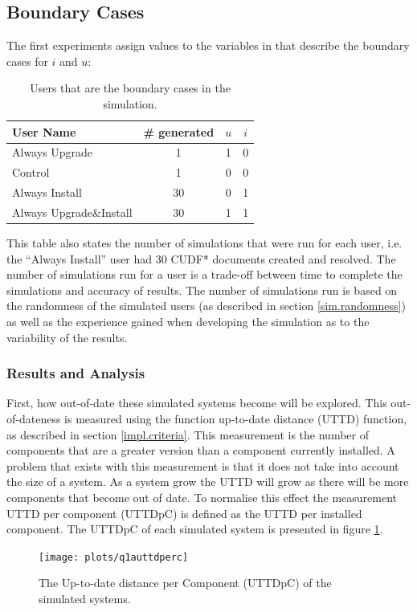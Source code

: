 \subsection{Boundary Cases}
The first experiments assign values to the variables in \usermodel that describe the boundary cases for $i$ and $u$:
\begin{table}[h!]
\centering
\begin{tabular}{|l | c | c | c |}
\hline
User Name 				 	& \# generated 	& $u$ 		& $i$ 			\\ \hline
Always Upgrade				& 1 			&1			& 0				 \\
Control						& 1 			& 0			& 0				\\
Always Install 				& 30 			& 0			& 1				 \\
Always Upgrade\&Install 	& 30 			&1			& 1				\\ \hline
\end{tabular}
\caption{Users that are the boundary cases in the simulation.}
\label{exp.tblextremeusers}
\end{table}
This table also states the number of simulations that were run for each user, i.e. the ``Always Install'' user had 30 CUDF* documents created and resolved.
The number of simulations run for a user is a trade-off between time to complete the simulations and accuracy of results.
The number of simulations run is based on the randomness of the simulated users (as described in section \ref{sim.randomness}) 
as well as the experience gained when developing the simulation as to the variability of the results.

\subsubsection{Results and Analysis}
First, how out-of-date these simulated systems become will be explored.
This out-of-dateness is measured using the function up-to-date distance (UTTD) function, as described in section \ref{impl.criteria}.
This measurement is the number of components that are a greater version than a component currently installed.
A problem that exists with this measurement is that it does not take into account the size of a system.
As a system grow the UTTD will grow as there will be more components that become out of date.
To normalise this effect the measurement UTTD per component (UTTDpC) is defined as the UTTD per installed component.
The UTTDpC of each simulated system is presented in figure \ref{exp.q1auttdpc}.
\begin{figure}[htp]
\begin{center}
  \texttt{[image: plots/q1auttdperc]}
  \caption{The Up-to-date distance per Component (UTTDpC) of the simulated systems.}
  \label{exp.q1auttdpc}
\end{center}
\end{figure}

